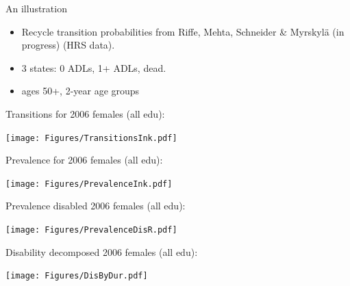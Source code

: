 \documentclass[20pt,usenames,dvipsnames]{beamer}
\begin{document}
\begin{frame}[plain]
\Large
\begin{center}
An illustration \vspace{2em}
\pause
\begin{itemize}[<+->]
  \item Recycle transition probabilities from \normalsize{Riffe, Mehta,
  Schneider \& Myrskyl\"a (in progress)} (HRS data).
  \item 3 states: 0 ADLs, 1+ ADLs, dead.
  \item ages 50+, 2-year age groups
\end{itemize}
\end{center}
\end{frame}


\begin{frame}[plain]
\Large
Transitions for 2006 females (all edu):\vspace{-1em}
\begin{center}
\texttt{[image: Figures/TransitionsInk.pdf]}
\end{center}
\end{frame}

\begin{frame}[plain]
\Large
Prevalence for 2006 females (all edu):\vspace{-1em}
\begin{center}
\texttt{[image: Figures/PrevalenceInk.pdf]}
\end{center}
\end{frame}

\begin{frame}[plain]
\Large
Prevalence disabled 2006 females (all edu):\vspace{-1em}
\begin{center}
\texttt{[image: Figures/PrevalenceDisR.pdf]}
\end{center}
\end{frame}

\begin{frame}[plain]
\Large
Disability decomposed 2006 females (all edu):\vspace{-1em}
\begin{center}
\texttt{[image: Figures/DisByDur.pdf]}
\end{center}
\end{frame}
\end{document}
